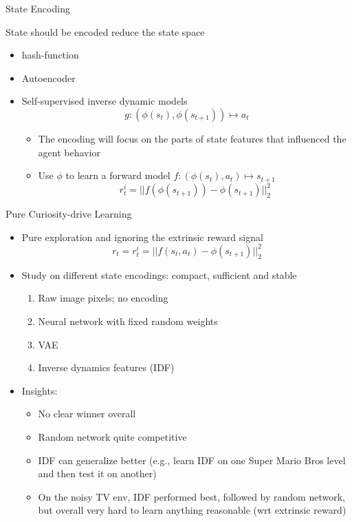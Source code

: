 \begin{frame}[c]{State Encoding}
	

	State should be encoded reduce the state space
	\begin{itemize}
		\item hash-function~
		\item Autoencoder~
		\item Self-supervised inverse dynamic models~
		$$g: (\phi(s_t), \phi(s_{t+1})) \mapsto a_t $$
		\begin{itemize}
			\item The encoding will focus on the parts of state features that influenced the agent behavior
			\item Use $\phi$ to learn a forward model $f: (\phi(s_t), a_t) \mapsto s_{t+1}$
			$$ r_t^i = || f(\phi(s_{t+1})) - \phi(s_{t+1})||^2_2$$
		\end{itemize}
	\end{itemize}
	
	
\end{frame}
\begin{frame}[c]{Pure Curiosity-drive Learning~}
	
	
	\begin{itemize}
		\item Pure exploration and ignoring the extrinsic reward signal
		$$r_t  = r_t^i = ||f(s_t, a_t) - \phi(s_{t+1}) ||_2^2 $$
		\item Study on different state encodings: compact, sufficient and stable
		\begin{enumerate}
			\item Raw image pixels; no encoding
			\item Neural network with fixed random weights
			\item VAE
			\item Inverse dynamics features (IDF)
		\end{enumerate}
		\item Insights:
		\begin{itemize}
			\item No clear winner overall
			\item Random network quite competitive
			\item IDF can generalize better (e.g., learn IDF on one Super Mario Bros level and then test it on another)
			\item On the noisy TV env, IDF performed best, followed by random network, but overall very hard to learn anything reasonable (wrt extrinsic reward)
		\end{itemize}
	\end{itemize}
	
	
\end{frame}
